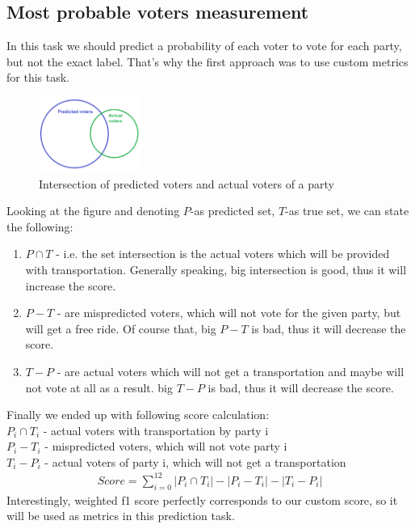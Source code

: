 \documentclass[12pt]{article}
\begin{document}
\subsection{Most probable voters measurement}
In this task we should predict a probability of each voter to vote for each party, but not the exact label. That's why the first approach was to use custom metrics for this task.
\begin{figure}[h]
\centering
\includegraphics[width=0.3\textwidth]{report_pics/sets}
\caption{Intersection of predicted voters and actual voters of a party}
\end{figure}
Looking at the figure and denoting $P$-as predicted set, $T$-as true set, we can state the following:
\begin{enumerate}
	\item $P \cap T$ - i.e. the set intersection is the actual voters which will be provided with transportation. Generally speaking, big intersection is good, thus it will increase the score.
	\item $P-T$ - are mispredicted voters, which will not vote for the given party, but will get a free ride. Of course that, big $P-T$ is bad, thus it will decrease the score.
	\item $T-P$ - are actual voters which will not get a transportation and maybe will not vote at all as a result. big $T-P$ is bad, thus it will decrease the score.
\end{enumerate} 
Finally we ended up with following score calculation:\\
$P_i \cap T_i$ - actual voters with transportation by party i \\
   $P_i - T_i$ - mispredicted voters, which will not vote party i \\
   $T_i -P_i$ - actual voters of party i, which will not get a transportation \\
\begin{gather*}   
   Score = \sum_{i=0}^{12} |P_i \cap T_i|-|P_i - T_i|-|T_i -P_i|  
\end{gather*}
Interestingly, weighted f1 score perfectly corresponds to our custom score, so it will be used as metrics in this prediction task.  
\end{document}
